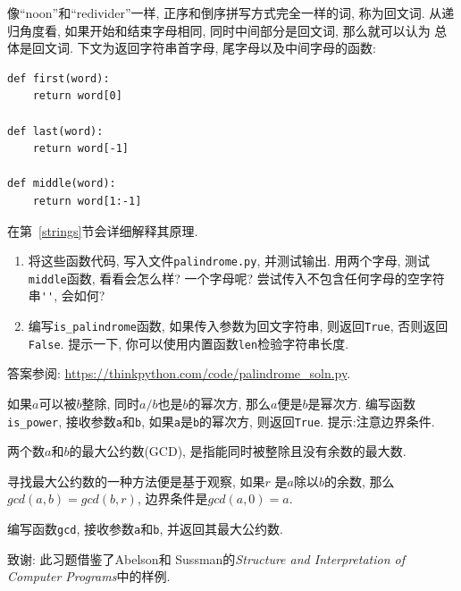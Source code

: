 \documentclass[10pt]{book}
\begin{document}
\begin{exercise}
\label{palindrome}

像``noon''和``redivider''一样, 正序和倒序拼写方式完全一样的词, 称为回文词. 
从递归角度看, 如果开始和结束字母相同, 同时中间部分是回文词, 那么就可以认为
总体是回文词. 
下文为返回字符串首字母, 尾字母以及中间字母的函数:

\begin{verbatim}
def first(word):
    return word[0]

def last(word):
    return word[-1]

def middle(word):
    return word[1:-1]
\end{verbatim}
%

在第~\ref{strings}节会详细解释其原理.

\begin{enumerate}

\item 将这些函数代码, 写入文件{\tt palindrome.py}, 并测试输出. 
用两个字母, 测试{\tt middle}函数, 看看会怎么样? 一个字母呢?  
尝试传入不包含任何字母的空字符串\verb"''",  会如何?

\item 编写\verb"is_palindrome"函数, 如果传入参数为回文字符串, 
则返回{\tt True}, 否则返回{\tt False}. 
提示一下, 你可以使用内置函数{\tt len}检验字符串长度. 

\end{enumerate}

答案参阅: \url{https://thinkpython.com/code/palindrome_soln.py}.

\end{exercise}

\begin{exercise}

如果$a$可以被$b$整除, 同时$a/b$也是$b$的幂次方, 那么$a$便是$b$是幂次方. 
编写函数\verb"is_power", 
接收参数{\tt a}和{\tt b}, 如果{\tt a}是{\tt b}的幂次方, 则返回{\tt True}. 
提示:注意边界条件. 

\end{exercise}


\begin{exercise}

两个数$a$和$b$的最大公约数(GCD), 是指能同时被整除且没有余数的最大数. 

寻找最大公约数的一种方法便是基于观察, 如果$r$ 是$a$除以$b$的余数, 
那么$gcd(a, b) = gcd(b, r)$, 边界条件是$gcd(a, 0) = a$.

编写函数\verb"gcd", 接收参数{\tt a}和{\tt b}, 并返回其最大公约数. 


致谢: 此习题借鉴了Abelson和
Sussman的{\em Structure and Interpretation of Computer Programs}中的样例.

\end{exercise}
\end{document}

